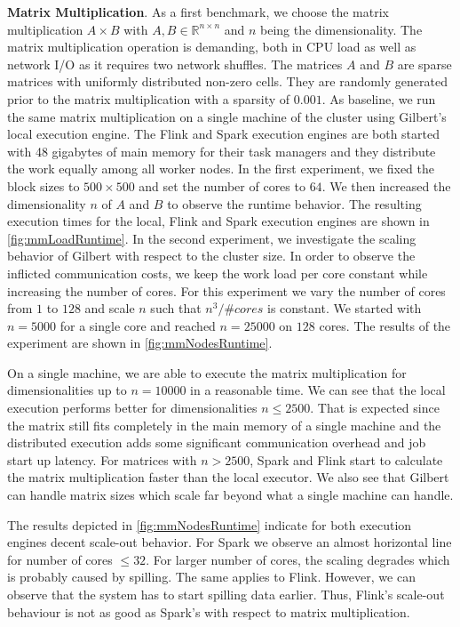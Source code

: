 \textbf{Matrix Multiplication}. 
As a first benchmark, we choose the matrix multiplication $A\times B$ with $A,B \in \mathbb{R}^{n\times n}$ and $n$ being the dimensionality. 
The matrix multiplication operation is demanding, both in CPU load as well as network I/O as it requires two network shuffles. 
The matrices $A$ and $B$ are sparse matrices with uniformly distributed non-zero cells. 
They are randomly generated prior to the matrix multiplication with a sparsity of $0.001$. 
As baseline, we run the same matrix multiplication on a single machine of the cluster using Gilbert's local execution engine. 
The Flink and Spark execution engines are both started with 48 gigabytes of main memory for their task managers and they distribute the work equally among all worker nodes. 
In the first experiment, we fixed the block sizes to $500 \times 500$ and set the number of cores to $64$. 
We then increased the dimensionality $n$ of $A$ and $B$ to observe the runtime behavior. 
The resulting execution times for the local, Flink and Spark execution engines are shown in \cref{fig:mmLoadRuntime}. 
In the second experiment, we investigate the scaling behavior of Gilbert with respect to the cluster size. 
In order to observe the inflicted communication costs, we keep the work load per core constant while increasing the number of cores. 
For this experiment we vary the number of cores from $1$ to $128$ and scale $n$ such that $n^3/\#cores$ is constant. 
We started with $n=5000$ for a single core and reached $n=25000$ on $128$ cores. 
The results of the experiment are shown in \cref{fig:mmNodesRuntime}. 

On a single machine, we are able to execute the matrix multiplication for dimensionalities up to $n=10000$ in a reasonable time. 
We can see that the local execution performs better for dimensionalities $n \le 2500$. 
That is expected since the matrix still fits completely in the main memory of a single machine and the distributed execution adds some significant communication overhead and job start up latency. 
For matrices with $n>2500$, Spark and Flink start to calculate the matrix multiplication faster than the local executor. 
We also see that Gilbert can handle matrix sizes which scale far beyond what a single machine can handle. 

The results depicted in \cref{fig:mmNodesRuntime} indicate for both execution engines decent scale-out behavior.
For Spark we observe an almost horizontal line for number of cores $\le 32$.
For larger number of cores, the scaling degrades which is probably caused by spilling.
The same applies to Flink.
However, we can observe that the system has to start spilling data earlier.
Thus, Flink's scale-out behaviour is not as good as Spark's with respect to matrix multiplication.

